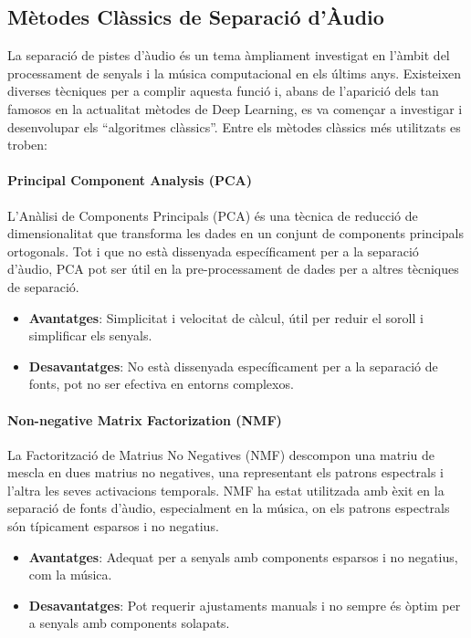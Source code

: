 \documentclass[10pt,a4paper,twocolumn,twoside]{article}
\begin{document}
\subsection{Mètodes Clàssics de Separació d'Àudio}
La separació de pistes d'àudio és un tema àmpliament investigat en l'àmbit del processament de senyals i la música computacional en els últims anys. Existeixen diverses tècniques per a complir aquesta funció i, abans de l'aparició dels tan famosos en la actualitat mètodes de Deep Learning, es va començar a investigar i desenvolupar els ``algoritmes clàssics''. Entre els mètodes clàssics més utilitzats es troben:

\paragraph{Principal Component Analysis (PCA)}
L'Anàlisi de Components Principals (PCA) \cite{PCA_jolliffe2002principal} és una tècnica de reducció de dimensionalitat que transforma les dades en un conjunt de components principals ortogonals. Tot i que no està dissenyada específicament per a la separació d'àudio, PCA pot ser útil en la pre-processament de dades per a altres tècniques de separació.

\begin{itemize}
    \item \textbf{Avantatges}: Simplicitat i velocitat de càlcul, útil per reduir el soroll i simplificar els senyals.
    \item \textbf{Desavantatges}: No està dissenyada específicament per a la separació de fonts, pot no ser efectiva en entorns complexos.
\end{itemize}

\paragraph{Non-negative Matrix Factorization (NMF)}
La Factorització de Matrius No Negatives (NMF) \cite{NMF_lee1999learning} descompon una matriu de mescla en dues matrius no negatives, una representant els patrons espectrals i l'altra les seves activacions temporals. NMF ha estat utilitzada amb èxit en la separació de fonts d'àudio, especialment en la música, on els patrons espectrals són típicament esparsos i no negatius.

\begin{itemize}
    \item \textbf{Avantatges}: Adequat per a senyals amb components esparsos i no negatius, com la música.
    \item \textbf{Desavantatges}: Pot requerir ajustaments manuals i no sempre és òptim per a senyals amb components solapats.
\end{itemize}
\end{document}
